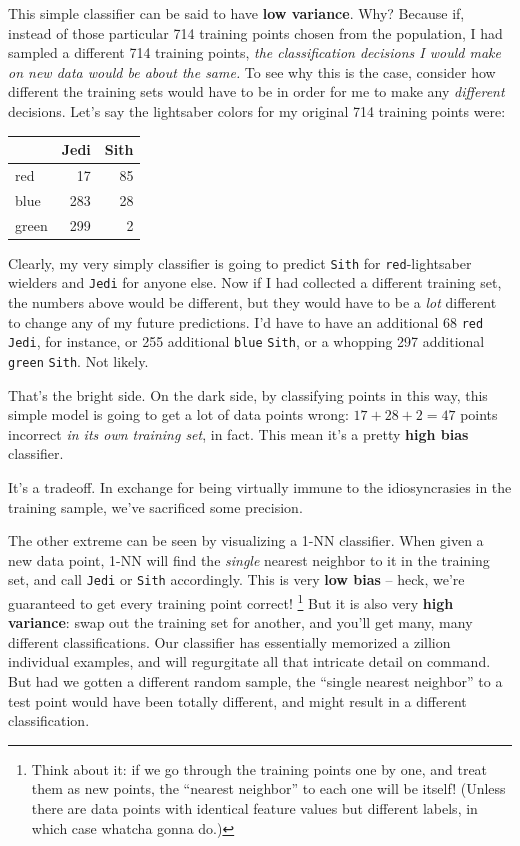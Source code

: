 This simple classifier can be said to have \textbf{low variance}. Why? Because
if, instead of those particular 714 training points chosen from the
population, I had sampled a different 714 training points, \textit{the
classification decisions I would make on new data would be about the same.} To
see why this is the case, consider how different the training sets would have
to be in order for me to make any \textit{different} decisions. Let's say the
lightsaber colors for my original 714 training points were:

\Large
\begin{center}
\begin{tabular}{|l|rr|}
\hline
& Jedi & Sith \\
\hline
red & 17 & 85 \\
blue & 283 & 28 \\
green & 299 & 2 \\
\hline
\end{tabular}
\end{center}
\normalsize

Clearly, my very simply classifier is going to predict \texttt{Sith} for
\texttt{red}-lightsaber wielders and \texttt{Jedi} for anyone else. Now if I
had collected a different training set, the numbers above would be different,
but they would have to be a \textit{lot} different to change any of my future
predictions. I'd have to have an additional 68 \texttt{red} \texttt{Jedi}, for
instance, or 255 additional \texttt{blue} \texttt{Sith}, or a whopping 297
additional \texttt{green} \texttt{Sith}. Not likely.

That's the bright side. On the dark side, by classifying points in this way,
this simple model is going to get a lot of data points wrong: $17+28+2=47$
points incorrect \textit{in its own training set}, in fact. This mean it's a
pretty \textbf{high bias} classifier.

It's a tradeoff. In exchange for being virtually immune to the idiosyncrasies
in the training sample, we've sacrificed some precision.


The other extreme can be seen by visualizing a 1-NN classifier. When given a
new data point, 1-NN will find the \textit{single} nearest neighbor to it in
the training set, and call \texttt{Jedi} or \texttt{Sith} accordingly. This is
very \textbf{low bias} -- heck, we're guaranteed to get every training point
correct! \footnote{Think about it: if we go through the training points one by
one, and treat them as new points, the ``nearest neighbor'' to each one will be
itself! (Unless there are data points with identical feature values but
different labels, in which case whatcha gonna do.)} But it is also very
\textbf{high variance}: swap out the training set for another, and you'll get
many, many different classifications. Our classifier has essentially memorized
a zillion individual examples, and will regurgitate all that intricate detail
on command. But had we gotten a different random sample, the ``single nearest
neighbor'' to a test point would have been totally different, and might result
in a different classification.
     
